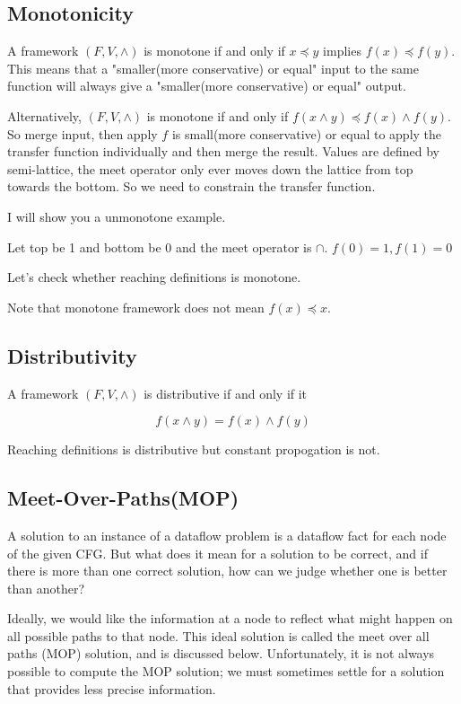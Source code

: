\subsection{Monotonicity}


A framework \((F,V,\wedge)\) is monotone if and only if \(x \preceq y \) implies \(f(x) \preceq f(y)\). This means that
a "smaller(more conservative) or equal" input to the same function will always give a "smaller(more conservative)  or equal" output.



Alternatively, \((F,V,\wedge)\) is monotone if and only if \(  f(x \wedge y) \preceq f(x) \wedge f(y)\). So  merge input, then apply \(f\) is small(more conservative)  or equal to apply the transfer
function individually and then merge the result. Values are defined by semi-lattice, the meet operator only ever moves down the lattice from top towards the bottom.
So we need to constrain the transfer function.

I will show you a unmonotone example.

Let top be 1 and bottom be 0 and the meet operator is \(\cap\). \(f(0) = 1, f(1) = 0\)


Let's check whether reaching definitions is monotone.


Note that monotone framework does not mean \(f(x) \preceq  x\).



\subsection{Distributivity}

A framework \((F,V,\wedge)\) is distributive if and only if it

\[
	f(x \wedge y) = f(x) \wedge f(y)
\]



Reaching definitions is distributive but constant propogation is not.


\subsection{Meet-Over-Paths(MOP)\cite{DATAFLOW66:online}}

A solution to an instance of a dataflow problem is a dataflow fact for each node of the given CFG. But what does it mean for a solution to be correct, and if there is more than one correct solution, how can we judge whether one is better than another?

Ideally, we would like the information at a node to reflect what might happen on all possible paths to that node. This ideal solution is called the meet over all paths (MOP) solution, and is discussed below. Unfortunately, it is not always possible to compute the MOP solution; we must sometimes settle for a solution that provides less precise information.


